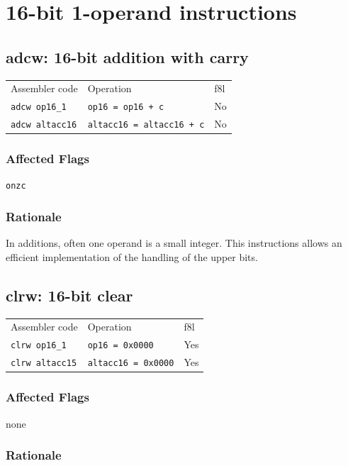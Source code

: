\documentclass{book}
\begin{document}
\section{16-bit 1-operand instructions}

\subsection{adcw: 16-bit addition with carry}

\begin{tabular}{l l l}
Assembler code         & Operation                        & f8l \\
\texttt{adcw op16\_1}  & \texttt{op16 = op16 + c}         & No \\
\texttt{adcw altacc16} & \texttt{altacc16 = altacc16 + c} & No
\end{tabular}

\subsubsection*{Affected Flags}

\texttt{onzc}

\subsubsection*{Rationale}

In additions, often one operand is a small integer. This instructions allows an efficient implementation of the handling of the upper bits.


\subsection{clrw: 16-bit clear}

\begin{tabular}{l l l}
Assembler code         & Operation                  & f8l \\
\texttt{clrw op16\_1}  & \texttt{op16 = 0x0000}     & Yes \\
\texttt{clrw altacc15} & \texttt{altacc16 = 0x0000} & Yes
\end{tabular}

\subsubsection*{Affected Flags}

none

\subsubsection*{Rationale}
\end{document}
